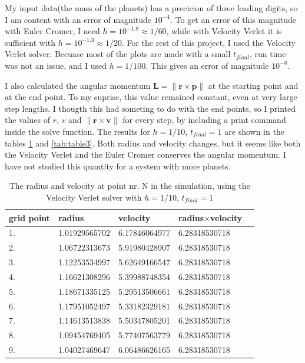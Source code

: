 \documentclass{article}
\begin{document}
My input data(the mass of the planets) has a precicion of three leading digits, so I am content with an error of magnitude $10^{-4}$. To get an error of this magnitude with Euler Cromer, I need $h=10^{-1.8}\approx 1/60$, while with Velocity Verlet it is sufficient with $h=10^{-1.3}\approx 1/20$. For the rest of this project, I used the Velocity Verlet solver. Becuase most of the plots are made with a small $t_{final}$, run time was not an issue, and I used $h=1/100$. This gives an error of magnitude $10^{-8}$. 


I also calculated the angular momentum $\bm{L} = \|\bm{r} \times \bm{p}\|$ at the starting point and at the end point. To my suprise, this value remained constant, even at very large step lengths. I thougth this had someting to do with the end points, so I printed the values of $r$, $v$ and $\|\bm{r} \times \bm{v}\|$ for every step, by including a print command inside the solve function. The results for $h=1/10$, $t_{final} = 1 $ are shown in the tables \ref{tab:table2} and \ref{tab:table3}. Both radius and velocity changes, but it seems like both the Velocity Verlet and the Euler Cromer conserves the angular momentum.   I have not studied this quantity for a system with more planets.%
\begin{table}[h!]
  \centering
  \caption{The radius and velocity at point nr. N in the simulation, using the Velocity Verlet solver with $h=1/10$, $t_{final} = 1 $}
  \label{tab:table2}
  \begin{tabular}{l||l|l|l|l}
grid point & radius & velocity & radius$\times$velocity \\
\hline
1. & 1.01929565702 & 6.17846064977 & 6.28318530718 \\
2. & 1.06722313673 & 5.91980428907 & 6.28318530718 \\
3. & 1.12253534997 & 5.62649166547 & 6.28318530718 \\
4. & 1.16621308296 & 5.39988748354 & 6.28318530718 \\
5. & 1.18671335125 & 5.29513506661 & 6.28318530718 \\
6. & 1.17951052497 & 5.33182329181 & 6.28318530718 \\
7. & 1.14613513838 & 5.50347805201 & 6.28318530718 \\
8. & 1.09454769405 & 5.77407563779 & 6.28318530718 \\
9. & 1.04027469647 & 6.06486626165 & 6.28318530718 \\

  \end{tabular}
\end{table}
\end{document}
